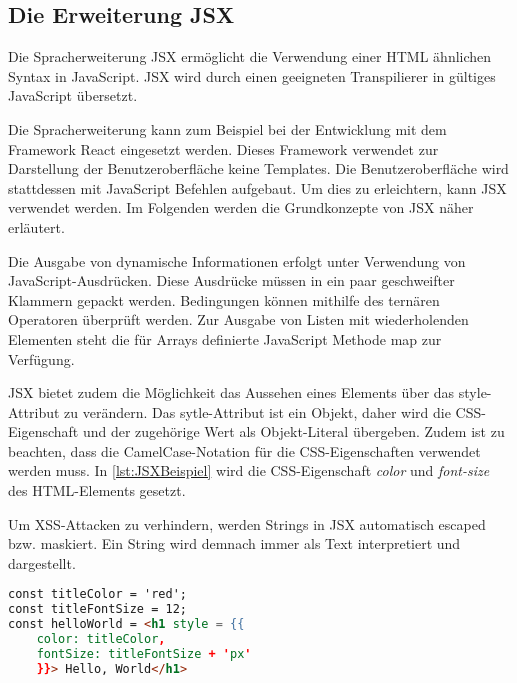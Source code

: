 \subsection{Die Erweiterung JSX}
Die Spracherweiterung JSX ermöglicht die Verwendung einer HTML ähnlichen Syntax in JavaScript. JSX wird durch einen geeigneten Transpilierer in gültiges JavaScript übersetzt. 

Die Spracherweiterung kann zum Beispiel bei der Entwicklung mit dem Framework React eingesetzt werden. Dieses Framework verwendet zur Darstellung der Benutzeroberfläche keine Templates. Die Benutzeroberfläche wird stattdessen mit JavaScript Befehlen aufgebaut. Um dies zu erleichtern, kann JSX verwendet werden. Im Folgenden werden die Grundkonzepte von JSX näher erläutert.

Die Ausgabe von dynamische Informationen erfolgt unter Verwendung von JavaScript-Ausdrücken. Diese Ausdrücke müssen in ein paar geschweifter Klammern gepackt werden. Bedingungen können mithilfe des ternären Operatoren überprüft werden. Zur Ausgabe von Listen mit wiederholenden Elementen steht die für Arrays definierte JavaScript Methode map zur Verfügung.

JSX bietet zudem die Möglichkeit das Aussehen eines Elements über das style-Attribut zu verändern. Das sytle-Attribut ist ein Objekt, daher wird die CSS-Eigenschaft und der zugehörige Wert als Objekt-Literal übergeben. Zudem ist zu beachten, dass die CamelCase-Notation für die CSS-Eigenschaften verwendet werden muss. In \autoref{lst:JSXBeispiel} wird die CSS-Eigenschaft \textit{color} und \textit{font-size} des HTML-Elements gesetzt.

Um XSS-Attacken zu verhindern, werden Strings in JSX automatisch escaped bzw. maskiert. Ein String wird demnach immer als Text interpretiert und dargestellt.\autocites[vgl.][59\psqq]{Zeigermann.2016}[vgl.][65\psqq]{Stefanov.2017} 

\begin{lstlisting}[caption=Beispiel für die Verwendung von JSX, label=lst:JSXBeispiel, language=HTML]
const titleColor = 'red';
const titleFontSize = 12;
const helloWorld = <h1 style = {{
	color: titleColor,
	fontSize: titleFontSize + 'px'
	}}> Hello, World</h1>
\end{lstlisting}


